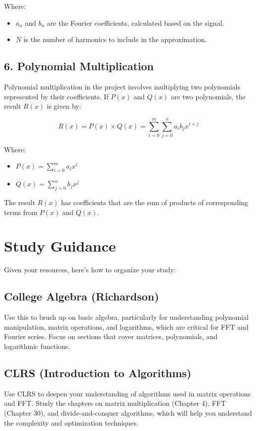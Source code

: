 \documentclass{article}
\begin{document}
Where:
\begin{itemize}
    \item $a_n$ and $b_n$ are the Fourier coefficients, calculated based on the signal.
    \item $N$ is the number of harmonics to include in the approximation.
\end{itemize}

\subsection{6. Polynomial Multiplication}

Polynomial multiplication in the project involves multiplying two polynomials represented by their coefficients. If $P(x)$ and $Q(x)$ are two polynomials, the result $R(x)$ is given by:

\[
R(x) = P(x) \times Q(x) = \sum_{i=0}^{m} \sum_{j=0}^{n} a_i b_j x^{i+j}
\]

Where:
\begin{itemize}
    \item $P(x) = \sum_{i=0}^{m} a_i x^i$
    \item $Q(x) = \sum_{j=0}^{n} b_j x^j$
\end{itemize}

The result $R(x)$ has coefficients that are the sum of products of corresponding terms from $P(x)$ and $Q(x)$.

\section{Study Guidance}

Given your resources, here’s how to organize your study:

\subsection{College Algebra (Richardson)}

Use this to brush up on basic algebra, particularly for understanding polynomial manipulation, matrix operations, and logarithms, which are critical for FFT and Fourier series. Focus on sections that cover matrices, polynomials, and logarithmic functions.

\subsection{CLRS (Introduction to Algorithms)}

Use CLRS to deepen your understanding of algorithms used in matrix operations and FFT. Study the chapters on matrix multiplication (Chapter 4), FFT (Chapter 30), and divide-and-conquer algorithms, which will help you understand the complexity and optimization techniques.
\end{document}
